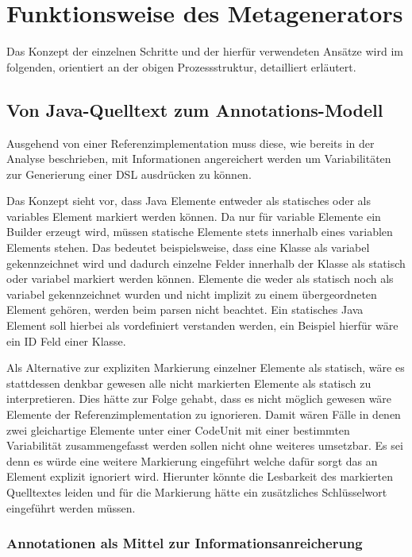 \documentclass[12pt,oneside,a4paper,parskip]{scrbook}
\begin{document}
\section{Funktionsweise des Metagenerators}

Das Konzept der einzelnen Schritte und der hierfür verwendeten Ansätze wird im folgenden, orientiert an der obigen Prozessstruktur, detailliert erläutert.

\subsection{Von Java-Quelltext zum Annotations-Modell}\label{sec:sourcetomodel}

Ausgehend von einer Referenzimplementation muss diese, wie bereits in der Analyse beschrieben, mit Informationen angereichert werden um Variabilitäten zur Generierung einer DSL ausdrücken zu können.

Das Konzept sieht vor, dass Java Elemente entweder als statisches oder als variables Element markiert werden können. Da nur für variable Elemente ein Builder erzeugt wird, müssen statische Elemente stets innerhalb eines variablen Elements stehen. Das bedeutet beispielsweise, dass eine Klasse als variabel gekennzeichnet wird und dadurch einzelne Felder innerhalb der Klasse als statisch oder variabel markiert werden können. Elemente die weder als statisch noch als variabel gekennzeichnet wurden und nicht implizit zu einem übergeordneten Element gehören, werden beim parsen nicht beachtet. Ein statisches Java Element soll hierbei als vordefiniert verstanden werden, ein Beispiel hierfür wäre ein ID Feld einer Klasse.

Als Alternative zur expliziten Markierung einzelner Elemente als statisch, wäre es stattdessen denkbar gewesen alle nicht markierten Elemente als statisch zu interpretieren. Dies hätte zur Folge gehabt, dass es nicht möglich gewesen wäre Elemente der Referenzimplementation zu ignorieren. Damit wären Fälle in denen zwei gleichartige Elemente unter einer CodeUnit mit einer bestimmten Variabilität zusammengefasst werden sollen nicht ohne weiteres umsetzbar. Es sei denn es würde eine weitere Markierung eingeführt welche dafür sorgt das an Element explizit ignoriert wird. Hierunter könnte die Lesbarkeit des markierten Quelltextes leiden und für die Markierung hätte ein zusätzliches Schlüsselwort eingeführt werden müssen.

\subsubsection{Annotationen als Mittel zur Informationsanreicherung}
\end{document}
